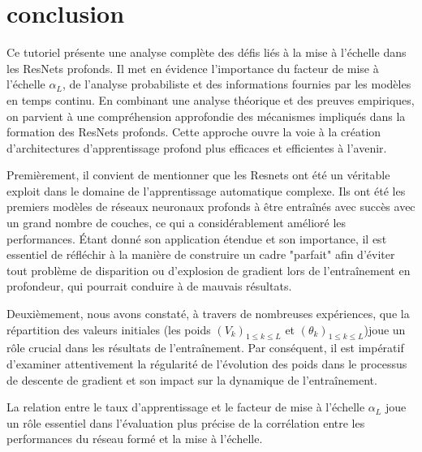 \chapter{conclusion}
Ce tutoriel présente une analyse complète des défis liés à la mise à l'échelle dans les ResNets profonds. Il met en évidence l'importance du facteur de mise à l'échelle \(\alpha_L\), de l'analyse probabiliste et des informations fournies par les modèles en temps continu. En combinant une analyse théorique et des preuves empiriques, on parvient à une compréhension approfondie des mécanismes impliqués dans la formation des ResNets profonds. Cette approche ouvre la voie à la création d'architectures d'apprentissage profond plus efficaces et efficientes à l'avenir.

Premièrement, il convient de mentionner que les Resnets ont été un véritable exploit dans le domaine de l'apprentissage automatique complexe. Ils ont été les premiers modèles de réseaux neuronaux profonds à être entraînés avec succès avec un grand nombre de couches, ce qui a considérablement amélioré les performances. Étant donné son application étendue et son importance, il est essentiel de réfléchir à la manière de construire un cadre "parfait" afin d'éviter tout problème de disparition ou d'explosion de gradient lors de l'entraînement en profondeur, qui pourrait conduire à de mauvais résultats.

Deuxièmement, nous avons constaté, à travers de nombreuses expériences, que la répartition des valeurs initiales (les poids $(V_k)_{1\leqslant k \leqslant L }$ et $(\theta_k)_{1\leqslant k \leqslant L }$)joue un rôle crucial dans les résultats de l'entraînement. Par conséquent, il est impératif d'examiner attentivement la régularité de l'évolution des poids dans le processus de descente de gradient et son impact sur la dynamique de l'entraînement.

La relation entre le taux d'apprentissage et le facteur de mise à l'échelle $\alpha_{L}$ joue un rôle essentiel dans l'évaluation plus précise de la corrélation entre les performances du réseau formé et la mise à l'échelle.